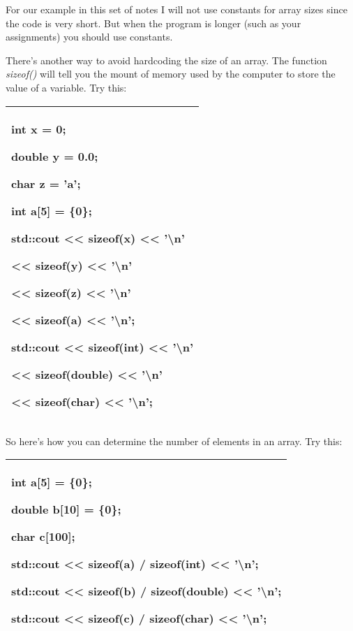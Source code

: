 \documentclass[
]{article}
\begin{document}
For our example in this set of notes I will not use constants for array
sizes since the code is very short. But when the program is longer (such
as your assignments) you should use constants.

There's another way to avoid hardcoding the size of an array. The
function \emph{sizeof()} will tell you the mount of memory used by the
computer to store the value of a variable. Try this:

\begin{longtable}[]{@{}l@{}}
\toprule
\endhead
\begin{minipage}[t]{0.97\columnwidth}\raggedright
int x = 0;

double y = 0.0;

char z = 'a';

int a{[}5{]} = \{0\};

std::cout \textless\textless{} sizeof(x) \textless\textless{}
'\textbackslash n'

\textless\textless{} sizeof(y) \textless\textless{} '\textbackslash n'

\textless\textless{} sizeof(z) \textless\textless{} '\textbackslash n'

\textless\textless{} sizeof(a) \textless\textless{} '\textbackslash n';

std::cout \textless\textless{} sizeof(int) \textless\textless{}
'\textbackslash n'

\textless\textless{} sizeof(double) \textless\textless{}
'\textbackslash n'

\textless\textless{} sizeof(char) \textless\textless{}
'\textbackslash n';\strut
\end{minipage}\tabularnewline
\bottomrule
\end{longtable}

So here's how you can determine the number of elements in an array. Try
this:

\begin{longtable}[]{@{}l@{}}
\toprule
\endhead
\begin{minipage}[t]{0.97\columnwidth}\raggedright
int a{[}5{]} = \{0\};

double b{[}10{]} = \{0\};

char c{[}100{]};

std::cout \textless\textless{} sizeof(a) / sizeof(int)
\textless\textless{} '\textbackslash n';

std::cout \textless\textless{} sizeof(b) / sizeof(double)
\textless\textless{} '\textbackslash n';

std::cout \textless\textless{} sizeof(c) / sizeof(char)
\textless\textless{} '\textbackslash n';\strut
\end{minipage}\tabularnewline
\bottomrule
\end{longtable}
\end{document}
